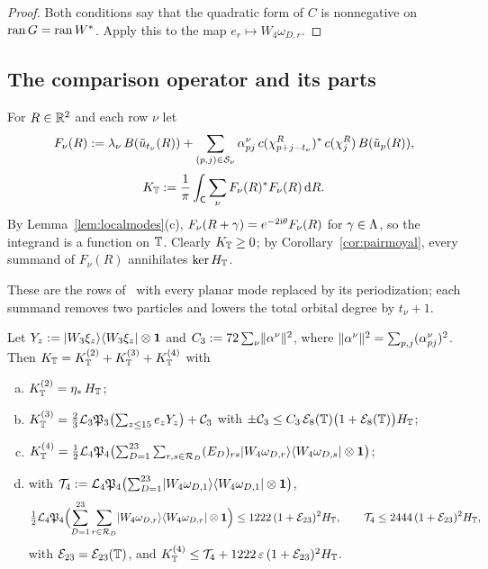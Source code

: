 \begin{proof}
Both conditions say that the quadratic form of $C$ is nonnegative on $\operatorname{ran} G=\operatorname{ran} W^*$. Apply this to the map
$e_r\mapsto W_4\omega_{D,r}$.
\end{proof}

\subsection{The comparison operator and its parts}

\begin{definition}\label{def:KT}
For $R\in\mathbb{R}^2$ and each row $\nu$ let
\[
F_\nu(R):=\lambda_\nu\,B(\tilde u_{t_\nu}(R))+\sum_{(p,j)\in\mathcal S_\nu}\alpha^\nu_{pj}\,c(\chi^R_{p+j-t_\nu})^*\,c(\chi_j^R)\,B(\tilde u_p(R)),
\]
\[
K_{\mathbb{T}}:=\frac1\pi\int_{\mathsf{C}}\sum_\nu F_\nu(R)^*F_\nu(R)\,\mathrm{d} R .
\]
By Lemma~\ref{lem:localmodes}(c), $F_\nu(R+\gamma)=e^{-2\mathrm{i}\theta}F_\nu(R)$ for $\gamma\in\Lambda$, so the integrand is a function on
$\mathbb{T}$. Clearly $K_{\mathbb{T}}\ge0$; by Corollary~\ref{cor:pairmoyal}, every summand of $F_\nu(R)$ annihilates $\ker H_{\mathbb{T}}$.
\end{definition}

These are the rows of~\cite[Section~4, (14)]{OAI:A-Fock-space-inequality-and-the-Laughlin-spectral-gap-September-24-2026} with every planar
mode replaced by its periodization; each summand removes two particles and lowers the total orbital degree by $t_\nu+1$.

\begin{proposition}\label{prop:parts}
Let $Y_z:=\lvert W_3\xi_z\rangle\langle W_3\xi_z\rvert\otimes\mathbf{1}$ and $C_{3}:=72\sum_\nu\lVert\alpha^\nu\rVert^2$, where $\lVert\alpha^\nu\rVert^2=\sum_{p,j}(\alpha^\nu_{pj})^2$.
Then $K_{\mathbb{T}}=K_{\mathbb{T}}^{(2)}+K_{\mathbb{T}}^{(3)}+K_{\mathbb{T}}^{(4)}$ with
\begin{enumerate}[(a)]
\item $K_{\mathbb{T}}^{(2)}=\eta_{*}\,H_{\mathbb{T}}$;
\item $K_{\mathbb{T}}^{(3)}=\frac23\mathcal{L}_3\mathfrak{P}_3\bigl(\sum_{z\le15}e_zY_z\bigr)+\mathcal C_3$ with $\pm\mathcal C_3\le C_{3}\,\mathcal{E}_8(\mathbb{T})\bigl(1+\mathcal{E}_8(\mathbb{T})\bigr)H_{\mathbb{T}}$;
\item $K_{\mathbb{T}}^{(4)}=\frac12\mathcal{L}_4\mathfrak{P}_4\bigl(\sum_{D=1}^{23}\sum_{r,s\in\mathcal R_D}(E_D)_{rs}\lvert W_4\omega_{D,r}\rangle\langle W_4\omega_{D,s}\rvert\otimes\mathbf{1}\bigr)$;
\item with $\mathcal T_4:=\mathcal{L}_4\mathfrak{P}_4\bigl(\sum_{D=1}^{23}\lvert W_4\omega_{D,1}\rangle\langle W_4\omega_{D,1}\rvert\otimes\mathbf{1}\bigr)$,
\[
\tfrac12\mathcal{L}_4\mathfrak{P}_4\Bigl(\sum_{D=1}^{23}\sum_{r\in\mathcal R_D}\lvert W_4\omega_{D,r}\rangle\langle W_4\omega_{D,r}\rvert\otimes\mathbf{1}\Bigr)\le1222\,(1+\mathcal{E}_{23})^2H_{\mathbb{T}},\qquad
\mathcal T_4\le2444\,(1+\mathcal{E}_{23})^2H_{\mathbb{T}},
\]
with $\mathcal{E}_{23}=\mathcal{E}_{23}(\mathbb{T})$, and $K_{\mathbb{T}}^{(4)}\le\mathcal T_4+1222\,\varepsilon\,(1+\mathcal{E}_{23})^2H_{\mathbb{T}}$.
\end{enumerate}
\end{proposition}

